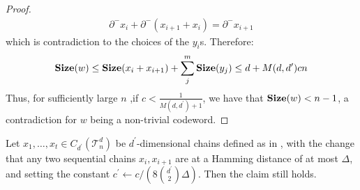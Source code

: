 \begin{proof}
\begin{equation*}
    \begin{split}
    \partial^{-}x_{i} + \partial^{-}(x_{i+1} + x_{i})  = \partial^{-}x_{i+1}
    \end{split}
  \end{equation*}
  which is contradiction to the choices of the $y_{i}$s.  Therefore:
\begin{equation*}
  \begin{split}
    \mathbf{Size}( w ) \le \mathbf{Size}(  x_{i} + x_{i+1} ) + \sum_{j}^{m} \mathbf{Size}(y_{j}) \le d + M(d,d^{\prime}) c n  
  \end{split}
\end{equation*}
Thus, for sufficiently large $n$ ,if $c < \frac{1}{M(d,d^{\prime})+1}$, we have that $\mathbf{Size}(w) < n-1$, a contradiction for $w$ being a non-trivial codeword.
\end{proof}



\begin{claim}
  \label{claim:barrierconstant}
  Let $x_{1}, \ldots, x_{t} \in C_{d^{\prime}}(\mathcal{T}_n^d)$ be $d^{\prime}$-dimensional chains defined as in , with the change that any two sequential chains $x_{i}, x_{i+1}$ are at a Hamming distance of at most $\Delta$, and setting the constant $c^{\prime} \leftarrow c/(8{ d^{\prime} \choose 2 }  \Delta )$. Then the claim still holds.
\end{claim}

